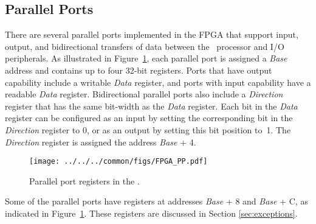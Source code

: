 \subsection{Parallel Ports}
There are several parallel ports implemented in the FPGA that support input, output, and
bidirectional transfers of data between the \processor~processor and I/O peripherals. As 
illustrated in Figure~\ref{fig:parallel_port}, each parallel port is assigned a {\it Base}
address and contains up to four 32-bit registers. Ports that have output capability include a
writable {\it Data} register, and ports with input capability have a readable {\it
Data} register. Bidirectional parallel ports also include a {\it Direction} register that 
has the same bit-width as the {\it Data} register. Each bit in the {\it Data} register can be
configured as an input by setting the corresponding bit in the {\it Direction} register to 0,
or as an output by setting this bit position to~1. The {\it Direction} register is assigned the
address {\it Base} + 4.

\begin{figure}[h!]
   \begin{center}
       \texttt{[image: ../../../common/figs/FPGA\_PP.pdf]}
   \end{center}
   \caption{Parallel port registers in the {\it \systemNameFull}.}
	\label{fig:parallel_port}
\end{figure}

Some of the parallel ports have registers at addresses 
{\it Base} + 8 and {\it Base} + C, as indicated in Figure~\ref{fig:parallel_port}. These
registers are discussed in Section \ref{sec:exceptions}.


